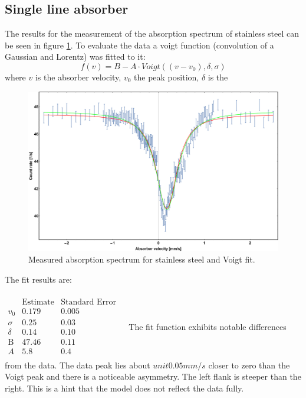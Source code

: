 \subsection{Single line absorber}
The results for the measurement of the absorption spectrum of stainless steel can be seen in figure \ref{fig:single line absorber:fitresult}. To evaluate the data a voigt function (convolution of a Gaussian and Lorentz) was fitted to it:
\begin{equation}
f(v)=B- A \cdot Voigt((v-v_0),\delta,\sigma )
\end{equation}
where $v$ is the absorber velocity, $v_0$ the peak position, $\delta$ is the 
\begin{figure}[H]
\centering
\includegraphics[width=1.0\linewidth]{graphics/voigtfittry}
\caption[Stainless steel spectrum]{Measured absorption spectrum for stainless steel and Voigt fit.}
\label{fig:single line absorber:fitresult}
\end{figure}
The fit results are:\\ \ \\
$\begin{array}{l|llll}
\text{} & \text{Estimate} & \text{Standard Error} \\
\hline
v_0 & 0.179 & 0.005\\
\sigma  & 0.25 & 0.03 \\
\delta  & 0.14 & 0.10\\
\text{B} & 47.46 & 0.11\\
A & 5.8 & 0.4 &\\
\end{array}$
The fit function exhibits notable differences from the data. The data peak lies about $unit{0.05}{mm/s}$ closer to zero than the Voigt peak and there is a noticeable asymmetry. The left flank is steeper than the right. This is a hint that the model does not reflect the data fully.
